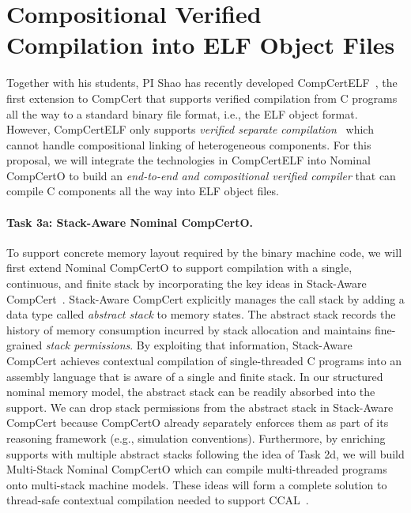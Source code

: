 \section{Compositional Verified Compilation into ELF Object Files}

Together with his students, PI Shao has recently developed
CompCertELF~\cite{compcertelf20}, the first extension to CompCert that
supports verified compilation from C programs all the way to a
standard binary file format, i.e., the ELF object format.  However,
CompCertELF only supports {\em{}verified separate
compilation}~\cite{sepcompcert} which cannot handle compositional linking of
heterogeneous components.  For this proposal, we will integrate the
technologies in CompCertELF into Nominal CompCertO to build an {\em
  end-to-end and compositional verified compiler} that can compile C
components all the way into ELF object files.

\vspace*{-2ex}
\paragraph*{Task 3a: Stack-Aware Nominal CompCertO.}
To support concrete memory layout required by the binary machine code,
we will first extend Nominal CompCertO to support compilation with a
single, continuous, and finite stack by incorporating the key ideas in
Stack-Aware CompCert~\cite{wang2019,compcertelf20}.  Stack-Aware
CompCert explicitly manages the call stack by adding a data type
called \emph{abstract stack} to memory states. The abstract stack
records the history of memory consumption incurred by stack allocation
and maintains fine-grained \emph{stack permissions}. By exploiting
that information, Stack-Aware CompCert achieves contextual compilation
of single-threaded C programs into an assembly language that is aware
of a single and finite stack.  In our structured nominal memory model,
the abstract stack can be readily absorbed into the support. We can
drop stack permissions from the abstract stack in Stack-Aware CompCert
because CompCertO already separately enforces them as part of its
reasoning framework (e.g., simulation conventions).  Furthermore, by
enriching supports with multiple abstract stacks following the idea of
Task 2d, we will build Multi-Stack Nominal CompCertO which can compile
multi-threaded programs onto multi-stack machine models. These ideas
will form a complete solution to thread-safe contextual compilation
needed to support CCAL~\cite{ccal18}.

